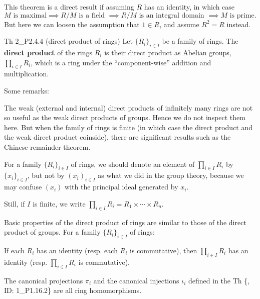 \documentclass{article}
\begin{document}
\begin{Rmk}{}
    This theorem is a direct result if assuming $R$ has an identity, in which case 
    $$ M \text{ is maximal} \implies R/M \text{ is a field } \implies R/M \text{ is an integral domain } \implies M \text{ is prime}. $$
    But here we can loosen the assumption that $1\in R$, and assume $R^2 = R$ instead.
\end{Rmk}

\begin{Df}{Th 2\_P2.4.4 (direct product of rings)}
    Let $\{R_i\}_{i\in I}$ be a family of rings. The \textbf{direct product} of the rings $R_i$ is their direct product as Abelian groups, $\prod_{i\in I} R_i$, \textcolor{Th}{which is a ring under the ``component-wise'' addition and multiplication.} 
\end{Df}

\begin{Rmk}{}
    Some remarks:
    \begin{compactenum}
        \item The weak (external and internal) direct products of infinitely many rings are not so useful as the weak direct products of groups. Hence we do not inspect them here. But when the family of rings is finite (in which case the direct product and the weak direct product coinside), there are significant results such as the Chinese remainder theorem.
        \item For a family $\{R_i\}_{i\in I}$ of rings, we should denote an element of $\prod_{i\in I} R_i$ by $\{x_i\}_{i\in I}$, but not by $(x_i)_{i\in I}$ as what we did in the group theory, because we may confuse $(x_i)$ with the principal ideal generated by $x_i$.
        \item \textcolor{Df}{Still, if $I$ is finite, we write $\prod_{i\in I} R_i = R_1\times\cdots\times R_n$.}
    \end{compactenum}
    Basic properties of the direct product of rings are similar to those of the direct product of groups. For a family $\{R_i\}_{i\in I}$ of rings:
    \begin{compactenum}
        \item \textcolor{Th}{If each $R_i$ has an identity (resp. each $R_i$ is commutative), then $\prod_{i\in I} R_i$ has an identity (resp. $\prod_{i\in I} R_i$ is commutative).} 
        \item \textcolor{Th}{The} \textcolor{Df}{canonical projections $\pi_i$ and the canonical injections $\iota_i$ defined in the Th \{, ID: 1\_P1.16.2\}} \textcolor{Th}{are all ring homomorphisms.}
    \end{compactenum}
\end{Rmk}
\end{document}
